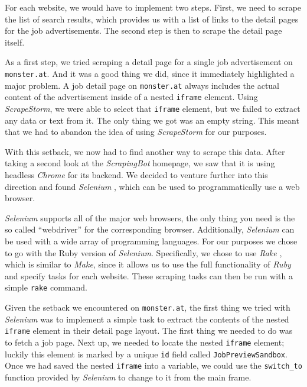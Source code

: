 \documentclass[runningheads]{llncs}
\begin{document}
For each website, we would have to implement two steps. First, we need to scrape the list of search results, which provides us with a list of links to the detail pages for the job advertisements. The second step is then to scrape the detail page itself.

As a first step, we tried scraping a detail page for a single job advertisement on \texttt{monster.at}. And it was a good thing we did, since it immediately highlighted a major problem. A job detail page on \texttt{monster.at} always includes the actual content of the advertisement inside of a nested \texttt{iframe} element. Using \textit{ScrapeStorm}, we were able to select that \texttt{iframe} element, but we failed to extract any data or text from it. The only thing we got was an empty string. This meant that we had to abandon the idea of using \textit{ScrapeStorm} for our purposes.

With this setback, we now had to find another way to scrape this data. After taking a second look at the \textit{ScrapingBot} homepage, we saw that it is using headless \textit{Chrome} for its backend. We decided to venture further into this direction and found \textit{Selenium} \cite{selenium}, which can be used to programmatically use a web browser.

\textit{Selenium} supports all of the major web browsers, the only thing you need is the so called “webdriver” for the corresponding browser. Additionally, \textit{Selenium} can be used with a wide array of programming languages. For our purposes we chose to go with the Ruby version of \textit{Selenium}. Specifically, we chose to use \textit{Rake} \cite{rake}, which is similar to \textit{Make}, since it allows us to use the full functionality of \textit{Ruby} \cite{ruby} and specify tasks for each website. These scraping tasks can then be run with a simple \texttt{rake} command.

Given the setback we encountered on \texttt{monster.at}, the first thing we tried with \textit{Selenium} was to implement a simple task to extract the contents of the nested \texttt{iframe} element in their detail page layout. The first thing we needed to do was to fetch a job page. Next up, we needed to locate the nested \texttt{iframe} element; luckily this element is marked by a unique \texttt{id} field called \texttt{JobPreviewSandbox}. Once we had saved the nested \texttt{iframe} into a variable, we could use the \texttt{switch\_to} function provided by \textit{Selenium} to change to it from the main frame.
\end{document}
